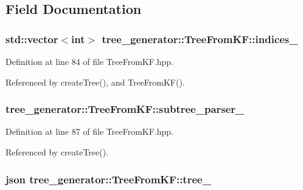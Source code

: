 \subsection{Field Documentation}
\hypertarget{classtree__generator_1_1TreeFromKF_aff6e96ef862180eebf69252f5a54c69c_aff6e96ef862180eebf69252f5a54c69c}{
\subsubsection[{indices\-\_\-}]{\setlength{\rightskip}{0pt plus 5cm}std\-::vector$<$int$>$ tree\-\_\-generator\-::\-Tree\-From\-K\-F\-::indices\-\_\-\hspace{0.3cm}{\ttfamily [private]}}}\label{classtree__generator_1_1TreeFromKF_aff6e96ef862180eebf69252f5a54c69c_aff6e96ef862180eebf69252f5a54c69c}


Definition at line 84 of file Tree\-From\-K\-F.\-hpp.



Referenced by create\-Tree(), and Tree\-From\-K\-F().

\hypertarget{classtree__generator_1_1TreeFromKF_a87133c4e05cd7ef3570a7bb65cc4d4d4_a87133c4e05cd7ef3570a7bb65cc4d4d4}{
\subsubsection[{subtree\-\_\-parser\-\_\-}]{ tree\-\_\-generator\-::\-Tree\-From\-K\-F\-::subtree\-\_\-parser\-\_\-\hspace{0.3cm}{\ttfamily [private]}}}\label{classtree__generator_1_1TreeFromKF_a87133c4e05cd7ef3570a7bb65cc4d4d4_a87133c4e05cd7ef3570a7bb65cc4d4d4}


Definition at line 87 of file Tree\-From\-K\-F.\-hpp.



Referenced by create\-Tree().

\hypertarget{classtree__generator_1_1TreeFromKF_afa058fe0e8ad1d8ee164bf2f896245ea_afa058fe0e8ad1d8ee164bf2f896245ea}{
\subsubsection[{tree\-\_\-}]{\setlength{\rightskip}{0pt plus 5cm}json tree\-\_\-generator\-::\-Tree\-From\-K\-F\-::tree\-\_\-\hspace{0.3cm}{\ttfamily [private]}}}\label{classtree__generator_1_1TreeFromKF_afa058fe0e8ad1d8ee164bf2f896245ea_afa058fe0e8ad1d8ee164bf2f896245ea}


